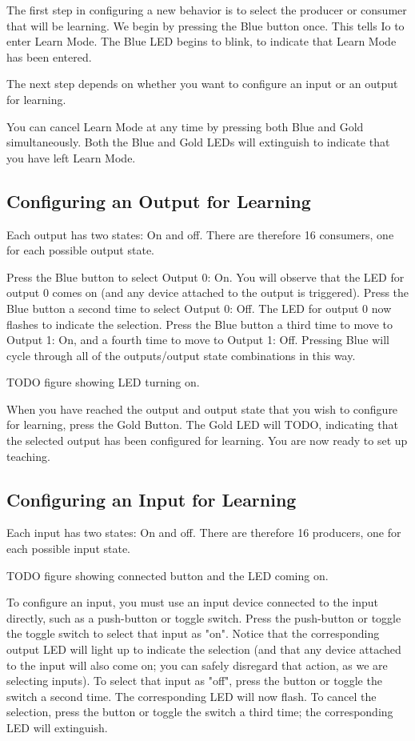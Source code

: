 \documentclass[12pt]{book}
\begin{document}
The first step in configuring a new behavior is to select the producer or consumer that will be learning. We begin by pressing the Blue button once. This tells Io to enter Learn Mode. The Blue LED begins to blink, to indicate that Learn Mode has been entered.

The next step depends on whether you want to configure an input or an output for learning.

You can cancel Learn Mode at any time by pressing both Blue and Gold simultaneously. Both the Blue and Gold LEDs will extinguish to indicate that you have left Learn Mode.

\subsection{Configuring an Output for Learning}

Each output has two states: On and off. There are therefore 16 consumers, one for each possible output state. 

Press the Blue button to select Output 0: On. You will observe that the LED for output 0 comes on (and any device attached to the output is triggered). Press the Blue button a second time to select Output 0: Off. The LED for output 0 now flashes to indicate the selection. Press the Blue button a third time to move to Output 1: On, and a fourth time to move to Output 1: Off. Pressing Blue will cycle through all of the outputs/output state combinations in this way.

TODO figure showing LED turning on.

When you have reached the output and output state that you wish to configure for learning, press the Gold Button. The Gold LED will TODO, indicating that the selected output has been configured for learning. You are now ready to set up teaching.

\subsection{Configuring an Input for Learning}

Each input has two states: On and off. There are therefore 16 producers, one for each possible input state.

TODO figure showing connected button and the LED coming on.

To configure an input, you must use an input device connected to the input directly, such as a push-button or toggle switch. Press the push-button or toggle the toggle switch to select that input as "on". Notice that the corresponding output LED will light up to indicate the selection (and that any device attached to the input will also come on; you can safely disregard that action, as we are selecting inputs). To select that input as "off", press the button or toggle the switch a second time. The corresponding LED will now flash. To cancel the selection, press the button or toggle the switch a third time; the corresponding LED will extinguish.
\end{document}
